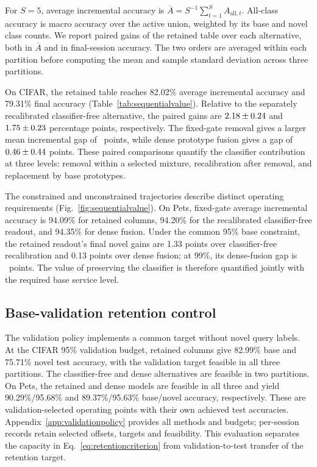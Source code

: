 \documentclass[research]{fcs}
\begin{document}
For $S=5$, average incremental accuracy is $\overline A=S^{-1}\sum_{t=1}^S A_{\mathrm{all},t}$. All-class accuracy is macro accuracy over the active union, weighted by its base and novel class counts. We report paired gains of the retained table over each alternative, both in $\overline A$ and in final-session accuracy. The two orders are averaged within each partition before computing the mean and sample standard deviation across three partitions.



On CIFAR, the retained table reaches 82.02\% average incremental accuracy and 79.31\% final accuracy (Table~\ref{tab:sequentialvalue}). Relative to the separately recalibrated classifier-free alternative, the paired gains are $2.18\pm0.24$ and $1.75\pm0.23$ percentage points, respectively. The fixed-gate removal gives a larger mean incremental gap of \CFRemovedAverageGain\ points, while dense prototype fusion gives a gap of $0.46\pm0.44$ points. These paired comparisons quantify the classifier contribution at three levels: removal within a selected mixture, recalibration after removal, and replacement by base prototypes.

The constrained and unconstrained trajectories describe distinct operating requirements (Fig.~\ref{fig:sequentialvalue}). On Pets, fixed-gate average incremental accuracy is 94.09\% for retained columns, 94.20\% for the recalibrated classifier-free readout, and 94.35\% for dense fusion. Under the common 95\% base constraint, the retained readout's final novel gains are 1.33 points over classifier-free recalibration and 0.13 points over dense fusion; at 99\%, its dense-fusion gap is \PetStrictGain\ points. The value of preserving the classifier is therefore quantified jointly with the required base service level.

\subsection{Base-validation retention control}
The validation policy implements a common target without novel query labels. At the CIFAR 95\% validation budget, retained columns give 82.99\% base and 75.71\% novel test accuracy, with the validation target feasible in all three partitions. The classifier-free and dense alternatives are feasible in two partitions. On Pets, the retained and dense models are feasible in all three and yield 90.29\%/95.68\% and 89.37\%/95.63\% base/novel accuracy, respectively. These are validation-selected operating points with their own achieved test accuracies. Appendix~\ref{app:validationpolicy} provides all methods and budgets; per-session records retain selected offsets, targets and feasibility. This evaluation separates the capacity in Eq.~\eqref{eq:retentioncriterion} from validation-to-test transfer of the retention target.
\end{document}
